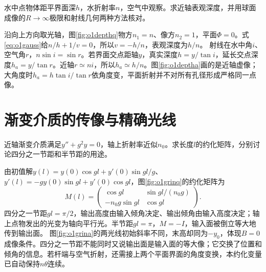 \begin{example}\label{ex:o1apparentdepth}
水中点物体距平界面深$h$，水折射率$n$，空气中观察。求近轴表观深度，并用球面成像的$R\to\infty$极限和射线几何两种方法核对。
\end{example}
\begin{solution}
沿向上方向取光轴，图\ref{fig:o1depthq}物方$n_1=n$、像方$n_2=1$，平面$\Phi=0$。式\eqref{eq:o1gauss}给$n/h+1/v=0$，所以$v=-h/n$，表观深度为$h/n$。
射线在水中角$i$、空气角$r$，$n\sin i=\sin r$。若界面交点距轴$y$，真实深度$h=y/\tan i$，延长交点深度$h_a=y/\tan r$。近轴$r\simeq ni$，所以$h_a\simeq h/n$。图\ref{fig:o1deptha}画的是近轴虚像；大角度时$h_a=h\tan i/\tan r$依角度变，平面折射并不对所有孔径形成严格同一点像。
\end{solution}

\section{渐变介质的传像与精确光线}
\begin{example}\label{ex:o1grinrelay}
近轴渐变介质满足$y''+g^2y=0$，轴上折射率近似$n_0$。求长度$l$的约化矩阵，分别讨论四分之一节距和半节距的用途。
\end{example}
\begin{solution}
由初值解$y(l)=y(0)\cos gl+y'(0)\sin gl/g$、$y'(l)=-gy(0)\sin gl+y'(0)\cos gl$，图\ref{fig:o1grinq}的约化矩阵为
\[
 M(l)=\begin{pmatrix}\cos gl&\sin gl/(n_0g)\\-n_0g\sin gl&\cos gl\end{pmatrix}.
\]
四分之一节距$gl=\pi/2$，输出高度由输入倾角决定、输出倾角由输入高度决定；轴上点物发出的光变为轴向平行光。半节距$gl=\pi$，$M=-I$，输入面被倒立等大地传到输出面。
图\ref{fig:o1grina}的两光线初始斜率不同，末高却同为$-y_0$，体现$B=0$成像条件。四分之一节距不能同时又说输出面是输入面的等大像；它交换了位置和倾角的信息。若杆端与空气折射，还需接上两个平面界面的角度变换，本约化变量已自动保持$n\theta$连续。
\end{solution}

